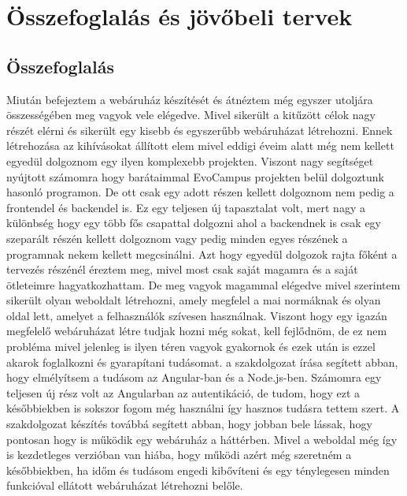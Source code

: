 \chapter{Összefoglalás és jövőbeli tervek}

\section{Összefoglalás}
Miután befejeztem a webáruház készítését és átnéztem még egyszer utoljára összességében meg vagyok vele elégedve. Mivel sikerült a kitűzött célok nagy részét elérni és sikerült egy kisebb és egyszerűbb webáruházat létrehozni. Ennek létrehozása az kihívásokat állított elem mivel eddigi éveim alatt még nem kellett egyedül dolgoznom egy ilyen komplexebb projekten. Viszont nagy segítséget nyújtott számomra hogy barátaimmal EvoCampus projekten belül dolgoztunk hasonló programon. De ott csak egy adott részen kellett dolgoznom nem pedig a frontendel és backendel is. Ez egy teljesen új tapasztalat volt, mert nagy a különbség hogy egy több fős csapattal dolgozni ahol a backendnek is csak egy szeparált részén kellett dolgoznom vagy pedig minden egyes részének a programnak nekem kellett megcsinálni. Azt hogy egyedül dolgozok rajta főként a tervezés részénél éreztem meg, mivel most csak saját magamra és a saját ötleteimre hagyatkozhattam. De meg vagyok magammal elégedve mivel szerintem sikerült olyan weboldalt létrehozni, amely megfelel a mai normáknak és olyan oldal lett, amelyet a felhasználók szívesen használnak. Viszont hogy egy igazán megfelelő webáruházat létre tudjak hozni még sokat, kell fejlődnöm, de ez nem probléma mivel jelenleg is ilyen téren vagyok gyakornok és ezek után is ezzel akarok foglalkozni és gyarapítani tudásomat. a szakdolgozat írása segített abban, hogy elmélyítsem a tudásom az Angular-ban és a Node.js-ben. Számomra egy teljesen új rész volt az Angularban az autentikáció, de tudom, hogy ezt a későbbiekben is sokszor fogom még használni így hasznos tudásra tettem szert. A szakdolgozat készítés továbbá segített abban, hogy jobban bele lássak, hogy pontosan hogy is működik egy webáruház a háttérben. Mivel a weboldal még így is kezdetleges verzióban van hiába, hogy működi azért még szeretném a későbbiekben, ha időm és tudásom engedi kibővíteni és egy ténylegesen minden funkcióval ellátott webáruházat létrehozni belőle.

